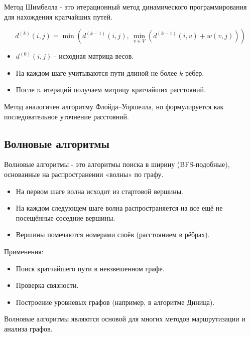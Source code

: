 {Метод Шимбелла - это итерационный метод динамического программирования для нахождения кратчайших путей.



\[
d^{(k)}(i,j) = \min \left( d^{(k-1)}(i,j),\ \min_{v \in V} \left( d^{(k-1)}(i,v) + w(v,j) \right) \right)
\]



\begin{itemize}
  \item $d^{(0)}(i,j)$ - исходная матрица весов.
  \item На каждом шаге учитываются пути длиной не более $k$ рёбер.
  \item После $n$ итераций получаем матрицу кратчайших расстояний.
\end{itemize}

Метод аналогичен алгоритму Флойда–Уоршелла, но формулируется как последовательное уточнение расстояний.

\subsection*{Волновые алгоритмы}

Волновые алгоритмы - это алгоритмы поиска в ширину (BFS-подобные), основанные на распространении «волны» по графу.

\begin{itemize}
  \item На первом шаге волна исходит из стартовой вершины.
  \item На каждом следующем шаге волна распространяется на все ещё не посещённые соседние вершины.
  \item Вершины помечаются номерами слоёв (расстоянием в рёбрах).
\end{itemize}

Применения:

\begin{itemize}
  \item Поиск кратчайшего пути в невзвешенном графе.
  \item Проверка связности.
  \item Построение уровневых графов (например, в алгоритме Диница).
\end{itemize}

Волновые алгоритмы являются основой для многих методов маршрутизации и анализа графов.


    \newpage
}
